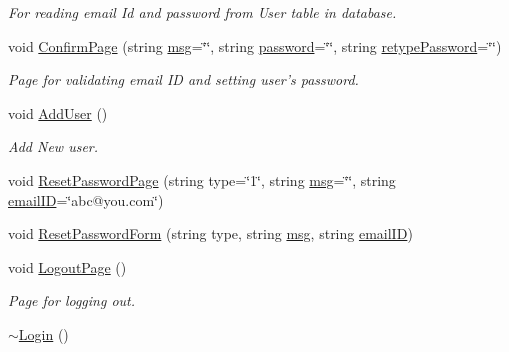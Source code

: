 \begin{DoxyCompactItemize}
\begin{DoxyCompactList}\small\item\em For reading email Id and password from User table in database. \end{DoxyCompactList}\item 
void \hyperlink{classLogin_a79ea5bbaeaa2ec6d21cd3195c522b863}{Confirm\-Page} (string \hyperlink{classInputDetail_a1abb16cd695678c3fa05e3c812823fee}{msg}=\char`\"{}\char`\"{}, string \hyperlink{classLogin_a39f7fd03b2b27c927c657ee73e7fcbbc}{password}=\char`\"{}\char`\"{}, string \hyperlink{classLogin_ade36f8943aafce470ef4b8353c79b2c6}{retype\-Password}=\char`\"{}\char`\"{})
\begin{DoxyCompactList}\small\item\em Page for validating email I\-D and setting user's password. \end{DoxyCompactList}\item 
void \hyperlink{classLogin_ac91737b2085d0b7e8943f49f2d08a0ff}{Add\-User} ()
\begin{DoxyCompactList}\small\item\em Add New user. \end{DoxyCompactList}\item 
void \hyperlink{classLogin_a4c5f4b15cce8b6bf325f35544f512fe2}{Reset\-Password\-Page} (string type=\char`\"{}1\char`\"{}, string \hyperlink{classInputDetail_a1abb16cd695678c3fa05e3c812823fee}{msg}=\char`\"{}\char`\"{}, string \hyperlink{classLogin_abea56d6d6403f1e627294f222dd77310}{email\-I\-D}=\char`\"{}abc@you.\-com\char`\"{})
\item 
void \hyperlink{classLogin_aa6978512971283a486347c3aa6ae0478}{Reset\-Password\-Form} (string type, string \hyperlink{classInputDetail_a1abb16cd695678c3fa05e3c812823fee}{msg}, string \hyperlink{classLogin_abea56d6d6403f1e627294f222dd77310}{email\-I\-D})
\item 
void \hyperlink{classLogin_a153d72df8d3333317e60219e8f6b8257}{Logout\-Page} ()
\begin{DoxyCompactList}\small\item\em Page for logging out. \end{DoxyCompactList}\item 
\hyperlink{classLogin_a659bc7233ec12c79b9fa523c1734fbbc}{$\sim$\-Login} ()
\end{DoxyCompactItemize}
